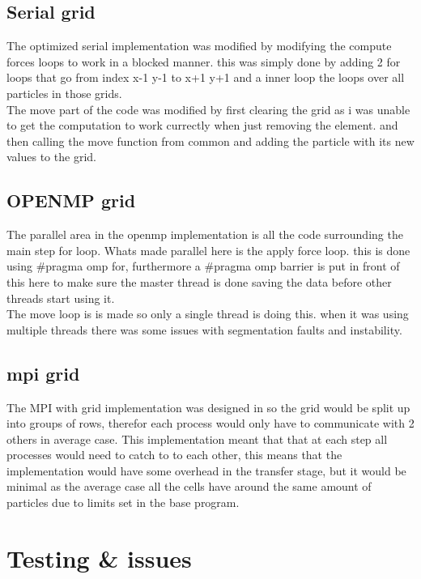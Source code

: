 \documentclass[a4paper,10pt,titlepage]{report}
\begin{document}
\subsection{Serial grid}

The optimized serial implementation was modified by modifying the compute forces loops to work in a blocked manner. this was simply done by adding 2 for loops that go from index x-1 y-1 to x+1 y+1 and a inner loop the loops over all particles in those grids.\\
The move part of the code was modified by first clearing the grid as i was unable to get the computation to work currectly when just removing the element. and then calling the move function from common and adding the particle with its new values to the grid. 

\subsection{OPENMP grid}
The parallel area in the openmp implementation is all the code surrounding the main step for loop. Whats made parallel here is the apply force loop. this is done using \#pragma omp for, furthermore a \#pragma omp barrier is put in front of this here to make sure the master thread is done saving the data before other threads start using it. \\

The move loop is is made so only a single thread is doing this. when it was using multiple threads there was some issues with segmentation faults and instability. \\

\subsection{mpi grid}
The MPI with grid implementation was designed in so the grid would be split up into groups of rows, therefor each process would only have to communicate with 2 others in average case. This implementation meant that that at each step all processes would need to catch to to each other, this means that the implementation would have some overhead in the transfer stage, but it would be minimal as the average case all the cells have around the same amount of particles due to limits set in the base program. \\


\newpage
\section{Testing \& issues}
\end{document}
